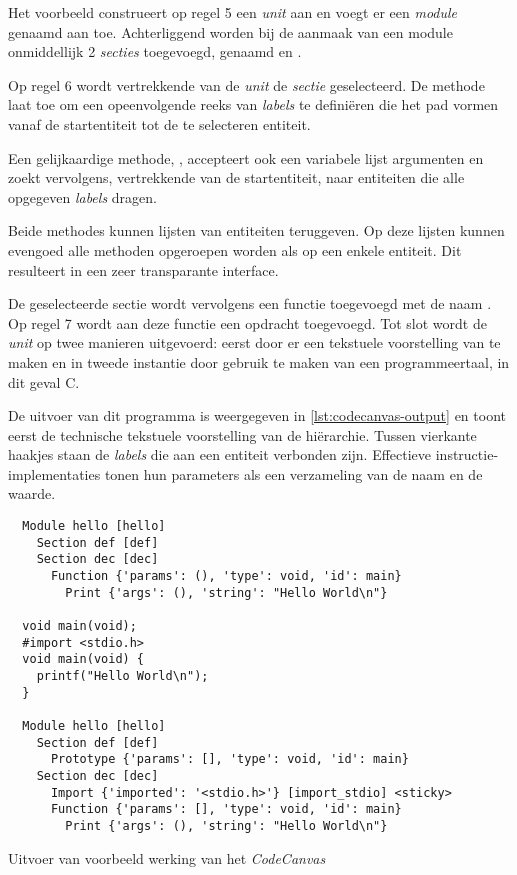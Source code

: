 Het voorbeeld construeert op regel 5 een \emph{unit} aan en voegt er een
\emph{module} genaamd  aan toe. Achterliggend worden bij de aanmaak
van een module onmiddellijk 2 \emph{secties} toegevoegd, genaamd  en
.

Op regel 6 wordt vertrekkende van de \emph{unit} de  \emph{sectie}
geselecteerd. De  methode laat toe om een opeenvolgende reeks van
\emph{labels} te defini\"eren die het pad vormen vanaf de startentiteit tot de
te selecteren entiteit.

Een gelijkaardige methode, , accepteert ook een variabele lijst
argumenten en zoekt vervolgens, vertrekkende van de startentiteit, naar
entiteiten die alle opgegeven \emph{labels} dragen.

Beide methodes kunnen lijsten van entiteiten teruggeven. Op deze lijsten kunnen
evengoed alle methoden opgeroepen worden als op een enkele entiteit. Dit
resulteert in een zeer transparante interface.

De geselecteerde sectie wordt vervolgens een functie toegevoegd met de naam
. Op regel 7 wordt aan deze functie een  opdracht
toegevoegd. Tot slot wordt de \emph{unit} op twee manieren uitgevoerd: eerst
door er een tekstuele voorstelling van te maken en in tweede instantie door
gebruik te maken van een programmeertaal, in dit geval C.

De uitvoer van dit programma is weergegeven in \ref{lst:codecanvas-output} en
toont eerst de technische tekstuele voorstelling van de hi\"erarchie. Tussen
vierkante haakjes staan de \emph{labels} die aan een entiteit verbonden zijn.
Effectieve instructie-implementaties tonen hun parameters als een verzameling
van de naam en de waarde.

\begin{listing}[ht]
  \begin{verbatim}
  Module hello [hello]
    Section def [def]
    Section dec [dec]
      Function {'params': (), 'type': void, 'id': main}
        Print {'args': (), 'string': "Hello World\n"}

  void main(void);
  #import <stdio.h>
  void main(void) {
    printf("Hello World\n");
  }
  
  Module hello [hello]
    Section def [def]
      Prototype {'params': [], 'type': void, 'id': main}
    Section dec [dec]
      Import {'imported': '<stdio.h>'} [import_stdio] <sticky>
      Function {'params': [], 'type': void, 'id': main}
        Print {'args': (), 'string': "Hello World\n"}
  \end{verbatim}
  \vspace{-5mm}
  \caption{Uitvoer van voorbeeld werking van het \emph{CodeCanvas}}
  \label{lst:codecanvas-output}
\end{listing}

